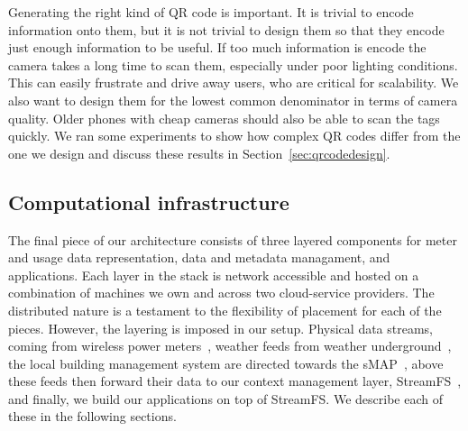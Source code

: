 Generating the right kind of QR code is important.  It is trivial to
encode information onto them, but it is
not trivial to design them so that they encode just enough information to be useful.  If 
too much information is encode the camera takes a long time to scan them, especially under poor lighting
conditions.  This can easily frustrate and drive away users, who are critical for scalability.
We also want to design them for the lowest common denominator in terms of camera quality.  Older
phones with cheap cameras should also be able to scan the tags quickly.  We ran some experiments to show
how complex QR codes differ from the one we design and discuss these results in Section~\ref{sec:qrcodedesign}.


\subsection{Computational infrastructure}

The final piece of our architecture consists of three layered
components for meter and usage data representation,
data and metadata managament, and applications.  Each layer in the stack is network accessible and hosted on a combination
of machines we own and across two cloud-service providers.  The distributed nature is a testament to the flexibility of
placement for each of the pieces.  However, the layering is imposed in our setup.  Physical data streams,
coming from wireless power meters~\cite{acme}, weather feeds from weather underground~\cite{weatherunderground}, the
local building management system are directed towards the sMAP~\cite{smap}, above these feeds then forward their data
to our context management layer, StreamFS~\cite{streamfs}, and finally, we build our applications on top of StreamFS.
We describe each of these in the following sections.

